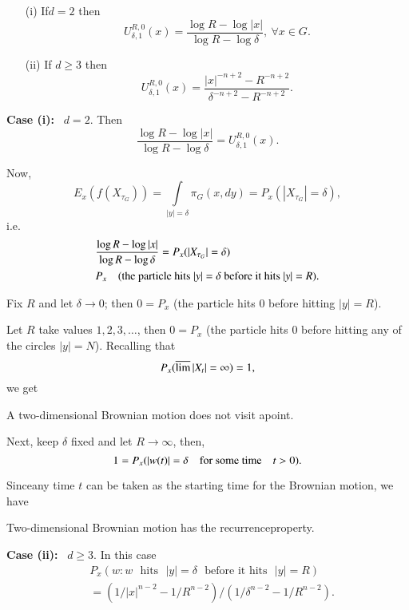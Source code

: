 \begin{exer*}
\begin{itemize}
\item[\rm(i)] If\pageoriginale $d=2$ then
$$
U^{R,0}_{\delta,1}(x)=\frac{\log R-\log |x|}{\log R-\log
  \delta},\ \forall x\in G.
$$

\item[(ii)] If $d\geq 3$ then
$$
U^{R,0}_{\delta,1}(x)=\frac{|x|^{-n+2}-R^{-n+2}}{\delta^{-n+2}-R^{-n+2}}. 
$$
\end{itemize}

\noindent
{\bf Case (i):}~ $d=2$. Then
$$
\frac{\log R-\log |x|}{\log R-\log \delta}=U^{R,0}_{\delta,1}(x).
$$

Now,
$$
E_{x}(f(X_{\tau_{G}}))=\int\limits_{|y|=\delta}\pi_{G}(x,dy)=P_{x}(|X_{\tau_{G}}|=\delta), 
$$
i.e.
\begin{align*}
& \frac{\log R-\log|x|}{\log R-\log
    \delta}=P_{x}(|X_{\tau_{G}}|=\delta)\\
& P_{x}\quad (\text{the particle hits~ }|y|=\delta\text{~ before it hits~ }|y|=R).
\end{align*}

Fix $R$ and let $\delta\to 0$; then
$0=P_{x}$ (the particle hits $0$ before hitting $|y|=R$).

Let $R$ take values $1,2,3,\ldots$, then $0=P_{x}$ (the particle hits
$0$ before hitting any of the circles $|y|=N$). Recalling that
$$
P_{x}(\varlimsup |X_{t}|=\infty)=1,
$$
we get
\end{exer*}

\begin{prop*}
A two-dimensional Brownian motion does not visit a\break point.

Next, keep $\delta$ fixed and let $R\to \infty$, then,
$$
1=P_{x}(|w(t)|=\delta\quad\text{for some time}\quad t>0).
$$

Since\pageoriginale any time $t$ can be taken as the starting time for
the Brownian motion, we have
\end{prop*}

\begin{prop*}
Two-dimensional Brownian motion has the recurrence\break pro\-perty.
\end{prop*}

\noindent
{\bf Case (ii):}~ $d\geq 3$. In this case
\begin{align*}
& P_{x}(w:w\text{~ hits~ }|y|=\delta\text{~ before it hits~ }|y|=R)\\
&=(1/|x|^{n-2}-1/R^{n-2})/(1/\delta^{n-2}-1/R^{n-2}). 
\end{align*}

